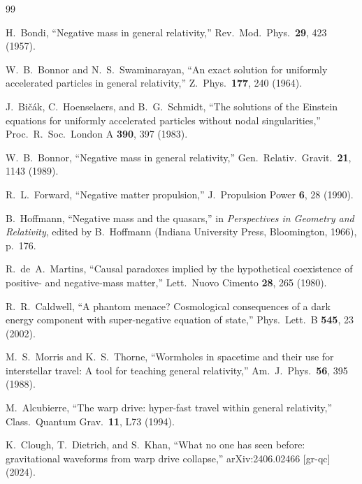 \documentclass[twocolumn,floatfix,aps,prd,nofootinbib]{revtex4-2}
\begin{document}
\FloatBarrier
\begin{thebibliography}{99}

H.~Bondi,
\newblock ``Negative mass in general relativity,''
\newblock Rev.\ Mod.\ Phys.\ \textbf{29}, 423 (1957).

W.~B.~Bonnor and N.~S.~Swaminarayan,
\newblock ``An exact solution for uniformly accelerated particles in general relativity,''
\newblock Z.\ Phys.\ \textbf{177}, 240 (1964).

J.~Bi\v{c}\'ak, C.~Hoenselaers, and B.~G.~Schmidt,
\newblock ``The solutions of the Einstein equations for uniformly accelerated particles without nodal singularities,''
\newblock Proc.\ R.\ Soc.\ London A \textbf{390}, 397 (1983).

W.~B.~Bonnor,
\newblock ``Negative mass in general relativity,''
\newblock Gen.\ Relativ.\ Gravit.\ \textbf{21}, 1143 (1989).

R.~L.~Forward,
\newblock ``Negative matter propulsion,''
\newblock J.\ Propulsion Power \textbf{6}, 28 (1990).

B.~Hoffmann,
\newblock ``Negative mass and the quasars,''
\newblock in \emph{Perspectives in Geometry and Relativity}, edited by B.~Hoffmann (Indiana University Press, Bloomington, 1966), p.~176.

R.~de~A.~Martins,
\newblock ``Causal paradoxes implied by the hypothetical coexistence of positive- and negative-mass matter,''
\newblock Lett.\ Nuovo Cimento \textbf{28}, 265 (1980).

R.~R.~Caldwell,
\newblock ``A phantom menace? Cosmological consequences of a dark energy component with super-negative equation of state,''
\newblock Phys.\ Lett.\ B \textbf{545}, 23 (2002).

M.~S.~Morris and K.~S.~Thorne,
\newblock ``Wormholes in spacetime and their use for interstellar travel: A tool for teaching general relativity,''
\newblock Am.\ J.\ Phys.\ \textbf{56}, 395 (1988).

M.~Alcubierre,
\newblock ``The warp drive: hyper-fast travel within general relativity,''
\newblock Class.\ Quantum Grav.\ \textbf{11}, L73 (1994).

K.~Clough, T.~Dietrich, and S.~Khan,
\newblock ``What no one has seen before: gravitational waveforms from warp drive collapse,''
\newblock arXiv:2406.02466 [gr-qc] (2024).


\end{thebibliography}
\end{document}
